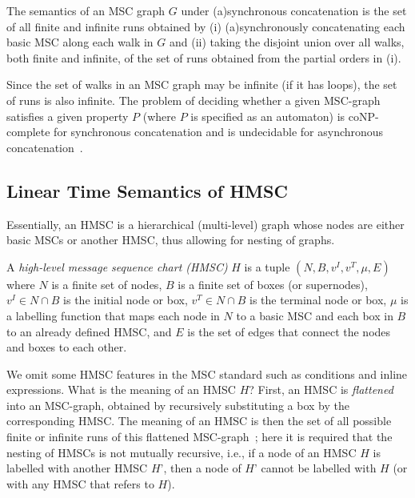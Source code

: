 \documentclass{entcs}
\begin{document}
\begin{definition}
\label{mscgsemantics}
The semantics of an MSC graph $G$ under (a)synchronous concatenation is the set of all 
finite and infinite runs obtained by (i) (a)synchronously 
concatenating each basic MSC along each walk in $G$ and 
(ii) taking the disjoint union over all walks, both 
finite and infinite, of the set of runs obtained from 
the partial orders in (i).
\end{definition}

Since the set of walks in an MSC graph may be infinite 
(if it has loops), the set of runs is also infinite. 
The problem of deciding whether a given MSC-graph 
satisfies a given property $P$ (where $P$ is specified 
as an automaton) is coNP-complete for synchronous concatenation 
and is undecidable for asynchronous concatenation~\cite{AlurYannakakis99}.

\subsection{Linear Time Semantics of HMSC}\label{hmsc1}

Essentially, an HMSC is a hierarchical (multi-level) 
graph whose nodes are either basic MSCs or another HMSC, 
thus allowing for nesting of graphs. 

\begin{definition}
\label{hmsc-def}
A {\em {high-level message sequence chart (HMSC)}} $H$ is a 
tuple $(N,B,v^I,v^T,\mu,E)$ where $N$ is a finite 
set of nodes, $B$ is a finite set of boxes 
(or supernodes), $v^I \in N \cap B$ is the initial 
node or box, $v^T \in N \cap B$ is the terminal 
node or box, $\mu$ is a labelling function that maps 
each node in $N$ to a basic MSC and each box in $B$ 
to an already defined HMSC, and $E$ is the set of 
edges that connect the nodes and boxes to each other.
\end{definition}

We omit some HMSC features in the MSC standard such as 
conditions and inline expressions. What is the meaning 
of an HMSC $H$? First, an HMSC is {\em flattened} into an 
MSC-graph, obtained by recursively substituting a box 
by the corresponding HMSC. The meaning of an HMSC is 
then the set of all possible finite or infinite runs 
of this flattened MSC-graph~\cite{AlurYannakakis99};
here it is required that the 
nesting of HMSCs is not mutually recursive, i.e., 
if a node of an HMSC $H$ is labelled with another HMSC 
$H$', then a node of $H$' cannot be labelled with $H$ 
(or with any HMSC that refers to $H$).
\end{document}
